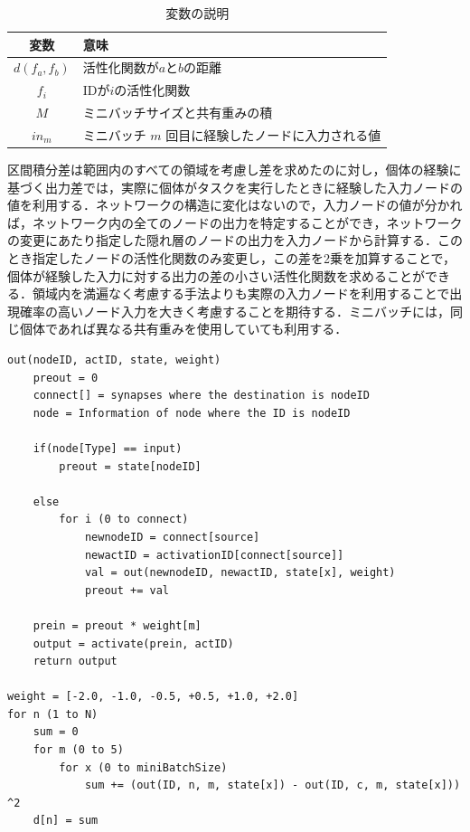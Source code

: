 \begin{table}[H]
    \caption{変数の説明}
    \centering
    \begin{tabular}{cl}
        \hline
        変数  & 意味 \\
        \hline \hline
        $d(f_{a}, f_{b})$ & 活性化関数が$a$と$b$の距離                 \\
        $f_{i}$           & IDが$i$の活性化関数                        \\
        $M$               & ミニバッチサイズと共有重みの積             \\
        $in_m$            & ミニバッチ $m$ 回目に経験したノードに入力される値 \\
        \hline
    \end{tabular}
\end{table}

区間積分差は範囲内のすべての領域を考慮し差を求めたのに対し，個体の経験に基づく出力差では，実際に個体がタスクを実行したときに経験した入力ノードの値を利用する．ネットワークの構造に変化はないので，入力ノードの値が分かれば，ネットワーク内の全てのノードの出力を特定することができ，ネットワークの変更にあたり指定した隠れ層のノードの出力を入力ノードから計算する．このとき指定したノードの活性化関数のみ変更し，この差を2乗を加算することで，個体が経験した入力に対する出力の差の小さい活性化関数を求めることができる．領域内を満遍なく考慮する手法よりも実際の入力ノードを利用することで出現確率の高いノード入力を大きく考慮することを期待する．ミニバッチには，同じ個体であれば異なる共有重みを使用していても利用する．

\begin{lstlisting}[caption=経験入力に基づく出力差のプログラム]
out(nodeID, actID, state, weight)
    preout = 0
    connect[] = synapses where the destination is nodeID
    node = Information of node where the ID is nodeID

    if(node[Type] == input)
        preout = state[nodeID]
    
    else
        for i (0 to connect)
            newnodeID = connect[source]
            newactID = activationID[connect[source]]
            val = out(newnodeID, newactID, state[x], weight)
            preout += val
    
    prein = preout * weight[m]
    output = activate(prein, actID)
    return output

weight = [-2.0, -1.0, -0.5, +0.5, +1.0, +2.0]
for n (1 to N)
    sum = 0
    for m (0 to 5)
        for x (0 to miniBatchSize)
            sum += (out(ID, n, m, state[x]) - out(ID, c, m, state[x])) ^2
    d[n] = sum
\end{lstlisting}

